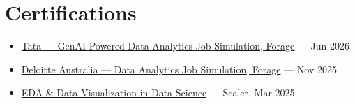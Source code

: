\documentclass[9.5pt,letterpaper]{article}
\newcommand{\resumeItem}[1]{\item \small{#1}}
\begin{document}
\vspace{-6pt}
\section{Certifications}
\small
\begin{itemize}[leftmargin=15pt, topsep=0pt, itemsep=0pt, parsep=0pt]
    \resumeItem{\href{https://www.theforage.com/completion-certificates/ifobHAoMjQs9s6bKS/gMTdCXwDdLYoXZ3wG_ifobHAoMjQs9s6bKS_68fe286e8740460a8e2eee23_1781158647518_completion_certificate.pdf}{Tata --- GenAI Powered Data Analytics Job Simulation, Forage} --- Jun 2026}
    \resumeItem{\href{https://www.theforage.com/completion-certificates/9PBTqmSxAf6zZTseP/io9DzWKe3PTsiS6GG_9PBTqmSxAf6zZTseP_68fe286e8740460a8e2eee23_1764513814343_completion_certificate.pdf}{Deloitte Australia --- Data Analytics Job Simulation, Forage} --- Nov 2025}
    \resumeItem{\href{https://moonshot.scaler.com/s/sl/YaiX7O36x6}{EDA \& Data Visualization in Data Science} --- Scaler, Mar 2025}
\end{itemize}
\end{document}
